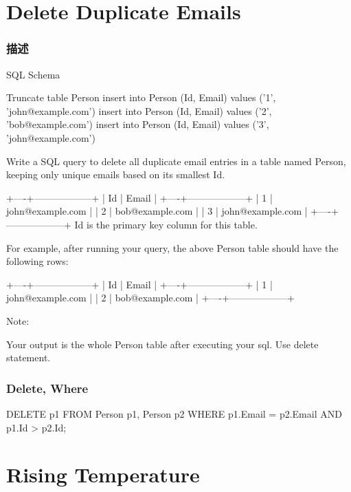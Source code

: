 \section{Delete Duplicate Emails} %
\label{sec:delete-duplicate-emails}


\subsubsection{描述}
SQL Schema

\begin{Code}
Truncate table Person
insert into Person (Id, Email) values ('1', 'john@example.com')
insert into Person (Id, Email) values ('2', 'bob@example.com')
insert into Person (Id, Email) values ('3', 'john@example.com')
\end{Code}

Write a SQL query to delete all duplicate email entries in a table named Person, keeping only unique emails based on its smallest Id.

\begin{Code}
+----+------------------+
| Id | Email            |
+----+------------------+
| 1  | john@example.com |
| 2  | bob@example.com  |
| 3  | john@example.com |
+----+------------------+
Id is the primary key column for this table.
\end{Code}

For example, after running your query, the above Person table should have the following rows:
\begin{Code}
+----+------------------+
| Id | Email            |
+----+------------------+
| 1  | john@example.com |
| 2  | bob@example.com  |
+----+------------------+
\end{Code}

Note:

Your output is the whole Person table after executing your sql. Use delete statement.

\subsubsection{Delete, Where}
\begin{Code}
DELETE p1 FROM Person p1,
    Person p2
WHERE
    p1.Email = p2.Email AND p1.Id > p2.Id;
\end{Code}

\section{Rising Temperature} %
\label{sec:rising-temperature}


